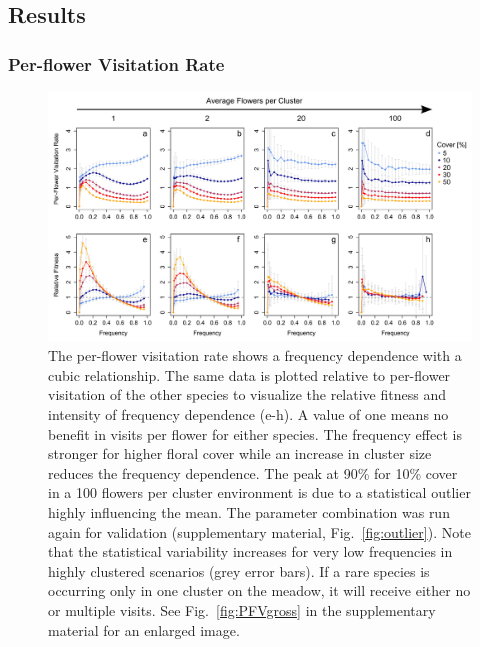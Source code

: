 \label{ch:results_model}

\subsection{Results}

\subsubsection*{Per-flower Visitation Rate}

\begin{figure} [!ht] %
	\centering
	\includegraphics[width=16cm]{Images/PFV}
	\caption{The per-flower visitation rate shows a frequency dependence with a cubic relationship. The same data is plotted relative to per-flower visitation of the other species to visualize the relative fitness and intensity of frequency dependence (e-h). A value of one means no benefit in visits per flower for either species. The frequency effect is stronger for higher floral cover while an increase in cluster size reduces the frequency dependence. The peak at 90\% for 10\% cover in a 100 flowers per cluster environment is due to a statistical outlier highly influencing the mean. The parameter combination was run again for validation (supplementary material, Fig.~\ref{fig:outlier}). Note that the statistical variability increases for very low frequencies in highly clustered scenarios (grey error bars). If a rare species is occurring only in one cluster on the meadow, it will receive either no or multiple visits. See Fig.~\ref{fig:PFVgross} in the supplementary material for an enlarged image.}
	\label{fig:PFV}
\end{figure}



